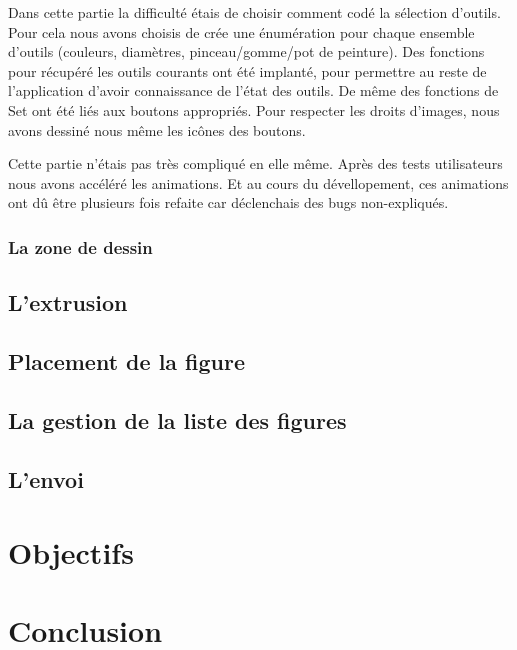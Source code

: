 \documentclass[a4paper,11pt]{article}
\begin{document}
				Dans cette partie la difficulté étais de choisir comment codé la sélection d'outils. Pour cela nous avons choisis de crée une énumération pour chaque ensemble d'outils (couleurs, diamètres, pinceau/gomme/pot de peinture). Des fonctions pour récupéré les outils courants ont été implanté, pour permettre au reste de l'application d'avoir connaissance de l'état des outils. De même des fonctions de Set ont été liés aux boutons appropriés. Pour respecter les droits d'images, nous avons dessiné nous même les icônes des boutons.
				
				Cette partie n'étais pas très compliqué en elle même. Après des tests utilisateurs nous avons accéléré les animations. Et au cours du dévellopement, ces animations ont dû être plusieurs fois refaite car déclenchais des bugs non-expliqués.
			\subsubsection{La zone de dessin}
		\subsection{L'extrusion}
		\subsection{Placement de la figure}
		\subsection{La gestion de la liste des figures}
		\subsection{L'envoi}
	\section{Objectifs}
	\section{Conclusion}
	
\end{document}

